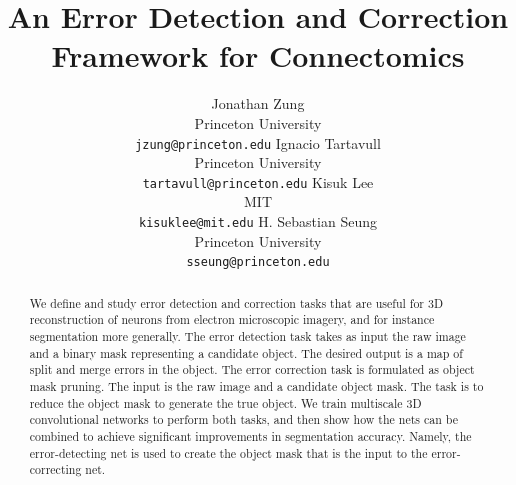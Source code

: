 \documentclass{article}
\title{An Error Detection and Correction Framework for Connectomics}
\author{
	Jonathan Zung\\
	Princeton University\\
	{\tt jzung@princeton.edu}
	\And
	Ignacio Tartavull\\
	Princeton University\\
	{\tt tartavull@princeton.edu}
	\And
	Kisuk Lee\\
	MIT\\
	{\tt kisuklee@mit.edu}
	\And
    H. Sebastian Seung\\
	Princeton University\\
	{\tt sseung@princeton.edu}
}
\begin{document}
\maketitle

\begin{abstract}
We define and study error detection and correction tasks that are
useful for 3D reconstruction of neurons from electron microscopic
imagery, and for instance segmentation more generally.  The error
detection task takes as input the raw image and a binary mask
representing a candidate object. The desired output is a map of split
and merge errors in the object. The error correction task is
formulated as object mask pruning. The input is the raw image
and a candidate object mask. The task is to reduce the object mask to
generate the true object. We train multiscale 3D convolutional
networks to perform both tasks, and then show how the nets can be
combined to achieve significant improvements in segmentation
accuracy. Namely, the error-detecting net is used to create the
object mask that is the input to the error-correcting net.
\end{abstract}
\end{document}
